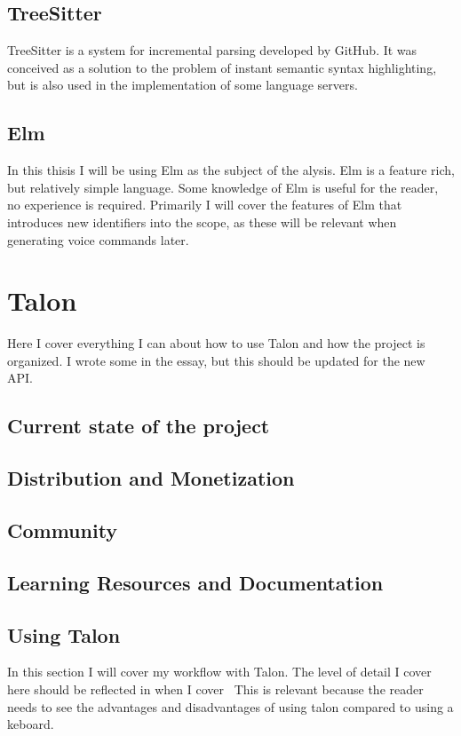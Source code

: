 \documentclass[a4paper,english]{ifimaster}
\begin{document}
\section{TreeSitter}
TreeSitter is a system for incremental parsing developed by GitHub.
It was conceived as a solution to the problem of instant semantic syntax highlighting,
but is also used in the implementation of some language servers.

\section{Elm}
In this thisis I will be using Elm as the subject of the alysis.
Elm is a feature rich, but relatively simple language.
Some knowledge of Elm is useful for the reader, no experience is required.
Primarily I will cover the features of Elm that introduces new identifiers into the scope,
as these will be relevant when generating voice commands later.

\chapter{Talon}\label{talon}
Here I cover everything I can about how to use Talon and how the project is organized.
I wrote some in the essay, but this should be updated for the new API.

\section{Current state of the project}
\section{Distribution and Monetization}
\section{Community}
\section{Learning Resources and Documentation}

\section{Using Talon}
In this section I will cover my workflow with Talon.
The level of detail I cover here should be reflected in when I cover~
This is relevant because the reader needs to see the advantages and disadvantages of using talon compared to using a keboard.
\end{document}
